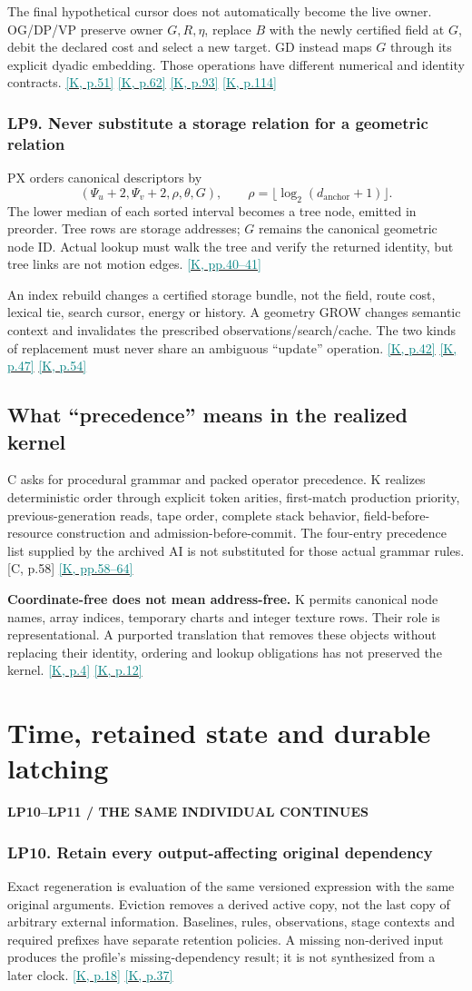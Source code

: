 \documentclass[11pt,a4paper]{article}
\newcommand{\kref}[1]{\hyperlink{baseline.#1}{\textcolor{teal}{[K, p.#1]}}}
\newcommand{\krange}[2]{\hyperlink{baseline.#1}{\textcolor{teal}{[K, pp.#1--#2]}}}
\newcommand{\crefpage}[1]{\textcolor{muted}{[C, p.#1]}}
\newcommand{\status}[1]{{\sffamily\bfseries\scriptsize\color{teal}#1}\par}
\newcommand{\req}[2]{\subsubsection{#1. #2}}
\newcommand{\sectionstart}[1]{\par\addvspace{18pt}\Needspace{12\baselineskip}\section{#1}}
\theoremstyle{lpstyle}
\begin{document}
The final hypothetical cursor does not automatically become the live owner. OG/DP/VP preserve owner $G,R,\eta$, replace $B$ with the newly certified field at $G$, debit the declared cost and select a new target. GD instead maps $G$ through its explicit dyadic embedding. Those operations have different numerical and identity contracts. \kref{51} \kref{62} \kref{93} \kref{114}

\req{LP9}{Never substitute a storage relation for a geometric relation}
PX orders canonical descriptors by
\[
(\Psi_u+2,\Psi_v+2,\rho,\theta,G),\qquad
\rho=\lfloor\log_2(d_{\mathrm{anchor}}+1)\rfloor.
\]
The lower median of each sorted interval becomes a tree node, emitted in preorder. Tree rows are storage addresses; $G$ remains the canonical geometric node ID. Actual lookup must walk the tree and verify the returned identity, but tree links are not motion edges. \krange{40}{41}

An index rebuild changes a certified storage bundle, not the field, route cost, lexical tie, search cursor, energy or history. A geometry GROW changes semantic context and invalidates the prescribed observations/search/cache. The two kinds of replacement must never share an ambiguous ``update'' operation. \kref{42} \kref{47} \kref{54}

\subsection{What ``precedence'' means in the realized kernel}
C asks for procedural grammar and packed operator precedence. K realizes deterministic order through explicit token arities, first-match production priority, previous-generation reads, tape order, complete stack behavior, field-before-resource construction and admission-before-commit. The four-entry precedence list supplied by the archived AI is not substituted for those actual grammar rules. \crefpage{58} \krange{58}{64}

\begin{scopebox}
\textbf{Coordinate-free does not mean address-free.} K permits canonical node names, array indices, temporary charts and integer texture rows. Their role is representational. A purported translation that removes these objects without replacing their identity, ordering and lookup obligations has not preserved the kernel. \kref{4} \kref{12}
\end{scopebox}

\sectionstart{Time, retained state and durable latching}
\status{LP10--LP11 / THE SAME INDIVIDUAL CONTINUES}
\req{LP10}{Retain every output-affecting original dependency}
Exact regeneration is evaluation of the same versioned expression with the same original arguments. Eviction removes a derived active copy, not the last copy of arbitrary external information. Baselines, rules, observations, stage contexts and required prefixes have separate retention policies. A missing non-derived input produces the profile's missing-dependency result; it is not synthesized from a later clock. \kref{18} \kref{37}
\end{document}
